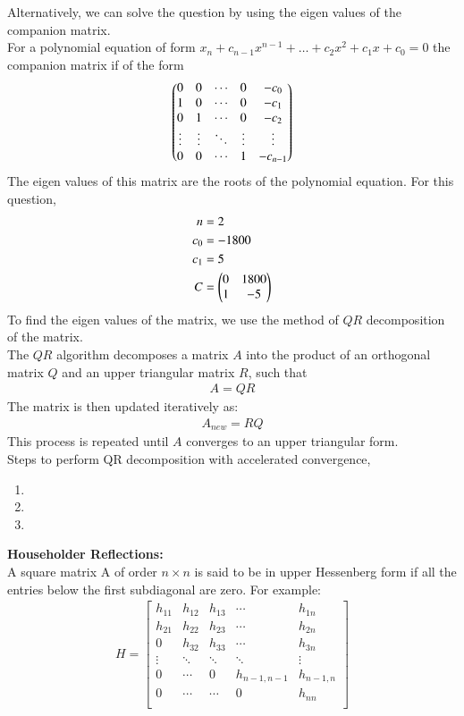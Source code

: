 \documentclass[journal, article]{IEEEtran}
\begin{document}
Alternatively, we can solve the question by using the eigen values of the companion matrix.\\
For a polynomial equation of form $x_n+c_{n-1}x^{n-1}+\dots+c_2x^2+c_1x+c_0 = 0$ the companion matrix if of the form
\begin{align}
	\begin{pmatrix}
		0 & 0 & \cdots & 0 & -c_0\\
		1 & 0 & \cdots & 0 & -c_1\\
		0 & 1 & \cdots & 0 & -c_2\\
		\vdots & \vdots & \ddots & \vdots & \vdots\\
		0 & 0 & \cdots & 1 & -c_{n-1}\\
	\end{pmatrix}
\end{align}
The eigen values of this matrix are the roots of the polynomial equation. For this question,
\begin{align}
	n &= 2\\
	c_0 &= -1800\\
	c_1 &= 5\\
	C &= \begin{pmatrix}0 & 1800 \\ 1 & -5\end{pmatrix}
\end{align}
To find the eigen values of the matrix, we use the method of $QR$ decomposition of the matrix.\\
The $QR$ algorithm decomposes a matrix $A$ into the product of an orthogonal matrix $Q$ and an upper triangular matrix $R$, such that
\begin{align}
	A = QR
\end{align}
The matrix is then updated iteratively as:
\begin{align}
	A_{new} = RQ
\end{align}
This process is repeated until $A$ converges to an upper triangular form.\\
Steps to perform QR decomposition with accelerated convergence,\\
\begin{enumerate}
	\item {}
	\item {}
	\item {}
\end{enumerate}
\textbf{Householder Reflections:}\\
A square matrix A of order $n \times n$ is said to be in upper Hessenberg form if all the entries below the first subdiagonal are zero.
For example:
\begin{align}
	H = 
	\begin{bmatrix}
		h_{11} & h_{12} & h_{13} & \cdots & h_{1n} \\
		h_{21} & h_{22} & h_{23} & \cdots & h_{2n} \\
		0      & h_{32} & h_{33} & \cdots & h_{3n} \\
		\vdots & \ddots & \ddots & \ddots & \vdots \\
		0      & \cdots & 0      & h_{n-1,n-1} & h_{n-1,n} \\
		0      & \cdots & \cdots & 0          & h_{nn} \\
	\end{bmatrix}
\end{align}
\end{document}

